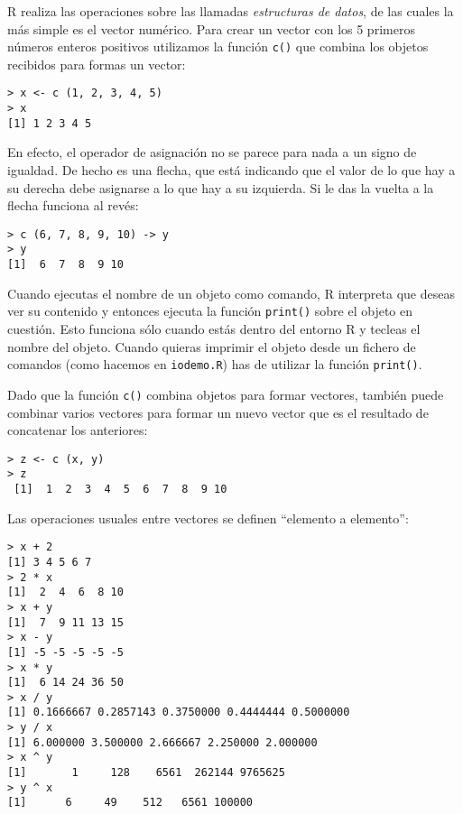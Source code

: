 
{\sf R} realiza las operaciones sobre las llamadas {\em estructuras de
datos}, de las cuales la más  simple es el vector numérico. Para crear
un vector con  los 5 primeros números enteros  positivos utilizamos la
función {\tt  c()} que  combina los objetos  recibidos para  formas un
vector:

\begin{verbatim}
> x <- c (1, 2, 3, 4, 5)
> x
[1] 1 2 3 4 5
\end{verbatim}


En efecto, el operador de asignación no se parece para nada a un signo
de igualdad. De  hecho es una flecha, que está  indicando que el valor
de lo que hay a su derecha debe asignarse a lo que hay a su izquierda.
Si le das la vuelta a la flecha funciona al revés:

\begin{verbatim}
> c (6, 7, 8, 9, 10) -> y
> y
[1]  6  7  8  9 10
\end{verbatim}

Cuando  ejecutas  el  nombre  de  un  objeto  como  comando,  {\sf  R}
interpreta que deseas  ver su contenido y entonces  ejecuta la función
{\tt print()} sobre  el objeto en cuestión. Esto  funciona sólo cuando
estás  dentro del  entorno {\sf  R} y  tecleas el  nombre del  objeto.
Cuando quieras imprimir  el objeto desde un fichero  de comandos (como
hacemos en {\tt iodemo.R}) has de utilizar la función {\tt print()}.

Dado que la función {\tt c()} combina objetos para formar vectores, 
también puede combinar varios vectores para formar un nuevo vector
que es el resultado de concatenar los anteriores:

\begin{verbatim}
> z <- c (x, y)
> z
 [1]  1  2  3  4  5  6  7  8  9 10
\end{verbatim}

Las  operaciones  usuales  entre  vectores  se  definen  ``elemento  a
elemento'':


\begin{verbatim}
> x + 2
[1] 3 4 5 6 7
> 2 * x
[1]  2  4  6  8 10
> x + y
[1]  7  9 11 13 15
> x - y
[1] -5 -5 -5 -5 -5
> x * y
[1]  6 14 24 36 50
> x / y
[1] 0.1666667 0.2857143 0.3750000 0.4444444 0.5000000
> y / x
[1] 6.000000 3.500000 2.666667 2.250000 2.000000
> x ^ y
[1]       1     128    6561  262144 9765625
> y ^ x
[1]      6     49    512   6561 100000
\end{verbatim}

